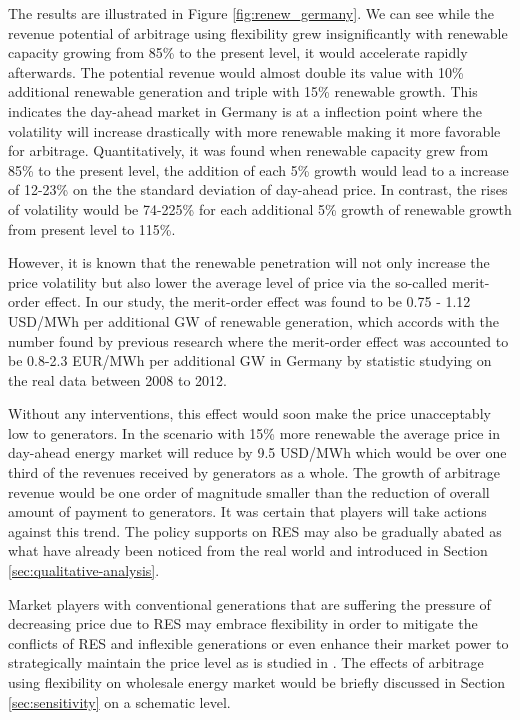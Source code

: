 The results are illustrated in Figure \ref{fig:renew_germany}. We can see while the revenue potential of arbitrage using flexibility grew insignificantly with renewable capacity growing from 85\% to the present level, it would accelerate rapidly afterwards. The potential revenue would almost double its value with 10\% additional renewable generation and triple with 15\% renewable growth. This indicates the day-ahead market in Germany is at a inflection point where the volatility will increase drastically with more renewable making it more favorable for arbitrage. Quantitatively, it was found when renewable capacity grew from 85\% to the present level, the addition of each 5\% growth would lead to a increase of 12-23\% on the
the standard deviation of day-ahead price. In contrast, the rises of volatility would be 74-225\% for each additional 5\% growth of renewable growth from present level to 115\%.

However, it is known that the renewable penetration will not only increase the price volatility but also lower the average level of price via the so-called merit-order effect. In our study, the merit-order effect was found to be 0.75 - 1.12 USD/MWh per additional GW of renewable generation, which accords with the number found by previous research where the merit-order effect was accounted to be 0.8-2.3 EUR/MWh  per additional GW in Germany by statistic studying on the real data between 2008 to 2012. 

Without any interventions, this effect would soon make the price unacceptably low to generators. In the scenario with 15\% more renewable the average price in day-ahead energy market will reduce by 9.5 USD/MWh which would be over one third of the revenues received by generators as a whole. The growth of arbitrage revenue would be one order of magnitude smaller than the reduction of overall amount of payment to generators. It was certain that players will take actions against this trend. The policy supports on RES may also be gradually abated as what have already been noticed from the real world and introduced in Section \ref{sec:qualitative-analysis}. 

Market players with conventional generations that are suffering the pressure of decreasing price due to RES may embrace flexibility in order to mitigate the conflicts of RES and inflexible generations or even enhance their market power to strategically maintain the price level as is studied in \cite{Schill2011}. The effects of arbitrage using flexibility on wholesale energy market would be briefly discussed in Section \ref{sec:sensitivity} on a schematic level.

